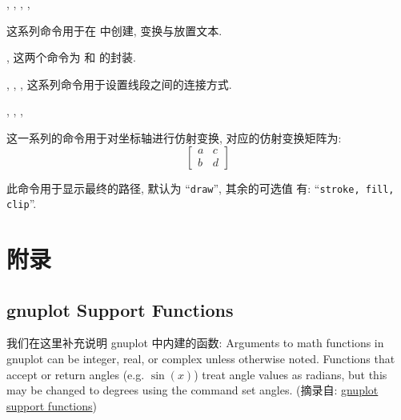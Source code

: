 \documentclass[
  hyper, lang=cn, 
  class=l3dox, 
]{../../zlatex/code/ztex}
\begin{document}
\begin{function}[added=2025-05-15]{\znewtext, \zsethtext, \zsetvtext, \zscaletext, \zputtext}
  \begin{syntax}
  \end{syntax}
  这系列命令用于在  中创建, 变换与放置文本.
\end{function}


\begin{function}[added=2025-05-15]{\zbg, \zeg}
  这两个命令为  和  的封装.
\end{function}



\begin{function}[added=2025-05-15]{\zcapbutt, \zcaproun, \zcaprect, \zclosepath}
  这系列命令用于设置线段之间的连接方式.
\end{function}


\begin{function}[added=2025-05-15]{\zshift, \zxscale, \zyscale, \ztrans}
  \begin{syntax}
  \end{syntax}
  这一系列的命令用于对坐标轴进行仿射变换,  对应的仿射变换矩阵为:
  \[\begin{bmatrix}
    a & c\\
    b & d
  \end{bmatrix}\]
\end{function}


\begin{function}[added=2025-05-15]{\zusepath}
  \begin{syntax}
  \end{syntax}
  此命令用于显示最终的路径,  默认为 ``\texttt{draw}'', 其余的可选值
  有: ``\texttt{stroke, fill, clip}''.
\end{function}


\clearpage
\section{附录}
\subsection{gnuplot Support Functions}
我们在这里补充说明 gnuplot 中内建的函数: Arguments to math functions in gnuplot can be integer, real, or 
complex unless otherwise noted. Functions that accept or return angles (e.g. $\sin(x)$) treat angle values as radians, 
but this may be changed to degrees using the command set angles.
(摘录自: \href{http://www.bersch.net/gnuplot-doc/expressions.html#expressions-functions-floor}{gnuplot support functions})
\end{document}
